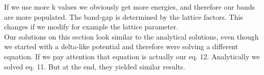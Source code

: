 \begin{questions}
\begin{solution}
\label{fig:three}\vspace{0.5cm}

If we use more k values we obviously get more energies, and therefore our bands are more populated. The band-gap is determined by the lattice factors. This changes if we modify for example the lattice parameter.\\

Our solutions on this section look similar to the analytical solutions, even though we started with a delta-like potential and therefore were solving a different equation. If we pay attention that equation is actually our eq. 12. Analytically we solved eq. 11. But at the end, they yielded similar results.

 \end{solution}

\end{questions}

%
%
